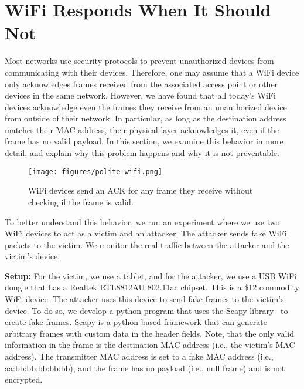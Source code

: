 \section{WiFi Responds When It Should Not}\label{sec:polite-wifi}

Most networks use security protocols to prevent unauthorized devices from communicating with their devices. Therefore, one may assume that a WiFi device only acknowledges frames received from the associated access point or other devices in the same network. However, we have found that all today's WiFi devices acknowledge even the frames they receive from an unauthorized device from outside of their network. In particular, as long as the destination address matches their MAC address, their physical layer acknowledges it, even if the frame has no valid payload. In this section, we examine this behavior in more detail, and explain why this problem happens and why it is not preventable.

\begin{figure}[!t]
    \centering
    \texttt{[image: figures/polite-wifi.png]}
    \caption{WiFi devices send an ACK for any frame they receive without checking if the frame is valid.}
    \label{fig:polite-wifi}
\end{figure}

To better understand this behavior, we run an experiment where we use two WiFi devices to act as a victim and an attacker. The attacker sends fake WiFi packets to the victim. We monitor the real traffic between the attacker and the victim's device.

\vspace{0.05in}
\noindent \textbf{Setup:} For the victim, we use a tablet, and for the attacker, we use a USB WiFi dongle that has a Realtek RTL8812AU 802.11ac chipset. This is a \$12 commodity WiFi device. The attacker uses this device to send fake frames to the victim's device. To do so, we develop a python program that uses the Scapy library~\cite{scapy} to create fake frames. Scapy is a python-based framework that can generate arbitrary frames with custom data in the header fields. Note, that the only valid information in the frame is the destination MAC address (i.e., the victim's MAC address). The transmitter MAC address is set to a fake MAC address (i.e., aa:bb:bb:bb:bb:bb), and the frame has no payload (i.e., null frame) and is not encrypted.

